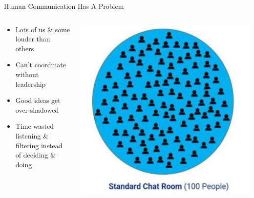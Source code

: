 \documentclass[aspectratio=169]{beamer}
\begin{document}
\begin{frame}{Human Communication Has A Problem}
\begin{columns}[T]
    \begin{column}[T]{0.5\textwidth}
        \begin{itemize}
            \item Lots of us \& some louder than others
            \item Can't coordinate without leadership
            \item Good ideas get over-shadowed
            \item Time wasted listening \& filtering instead of deciding \& doing
        \end{itemize}
    \end{column}
    \begin{column}{0.5\textwidth}
        \includegraphics[height=0.8\textheight]{imgs/CSI_section/standard_chat_room.png}
    \end{column}
\end{columns}
\end{frame}
\end{document}
